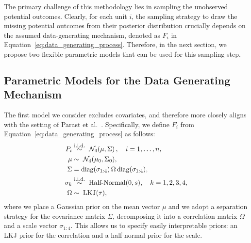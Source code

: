 \documentclass[12pt]{article}
\newcommand{\iid}{\overset{\text{\footnotesize i.i.d.}}{\sim}}
\begin{document}
The primary challenge of this methodology lies in sampling the unobserved potential outcomes. Clearly, for each unit \(i\), the sampling strategy to draw the missing potential outcomes from their posterior distribution crucially depends on the assumed data-generating mechanism, denoted as \(F_{i}\) in Equation~\eqref{eq:data_generating_process}. Therefore, in the next section, we propose two flexible parametric models that can be used for this sampling step.

\subsection{Parametric Models for the Data Generating Mechanism}\label{subsection:parametric_models}

The first model we consider excludes covariates, and therefore more closely aligns with the setting of Parast et al.\ \citep{parast2024rank}. Specifically, we define \(F_{i}\) from Equation~\eqref{eq:data_generating_process} as follows:
\begin{equation}
  \label{eq:parametric_model}
  \begin{aligned}
    P_{i} & \iid \; \mathcal{N}_{4}\!\left( \mu , \Sigma \right), \quad i=1,\ldots,n, \\
    \mu & \sim \; \mathcal{N}_{4}(\mu_{0}, \Sigma_{0}), \\
    \Sigma &= \text{diag}(\sigma_{1:4}) \,\Omega\, \text{diag}(\sigma_{1:4}), \\
    \sigma_{k} &\iid \; \text{Half-Normal}(0, s), \quad k = 1,2,3,4, \\
    \Omega & \sim \; \text{LKJ}(\tau),
  \end{aligned}
\end{equation}
where we place a Gaussian prior on the mean vector \(\mu\) and we adopt a separation strategy \citep{barnard2000modeling} for the covariance matrix \(\Sigma\), decomposing it into a correlation matrix \(\Omega\) and a scale vector \(\sigma_{1:4}\). This allows us to specify easily interpretable priors: an LKJ prior \citep{lewandowski2009generating} for the correlation and a half-normal prior for the scale.
\end{document}
